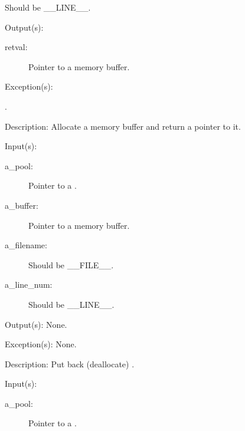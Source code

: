 \begin{capi}
\begin{capilist}
\begin{description}
			Should be \_\_LINE\_\_.
		\end{description}
	\item[Output(s): ]
		\begin{description}\item[]
		\item[retval: ]
			Pointer to a memory buffer.
		\end{description}
	\item[Exception(s): ]
		\begin{description}\item[]
		\item[.]
		\end{description}
	\item[Description: ]
		Allocate a memory buffer and return a pointer to it.
	\end{capilist}
\label{pool_put_e}
\label{pool_put}
	\begin{capilist}
	\item[Input(s): ]
		\begin{description}\item[]
		\item[a\_pool: ]
			Pointer to a .
		\item[a\_buffer: ]
			Pointer to a memory buffer.
		\item[a\_filename: ]
			Should be \_\_FILE\_\_.
		\item[a\_line\_num: ]
			Should be \_\_LINE\_\_.
		\end{description}
	\item[Output(s): ] None.
	\item[Exception(s): ] None.
	\item[Description: ]
		Put back (deallocate) .
	\end{capilist}
\label{pool_dump}
	\begin{capilist}
	\item[Input(s): ]
		\begin{description}\item[]
		\item[a\_pool: ]
			Pointer to a \classname{pool}.

\end{description}
\end{capilist}
\end{capi}

